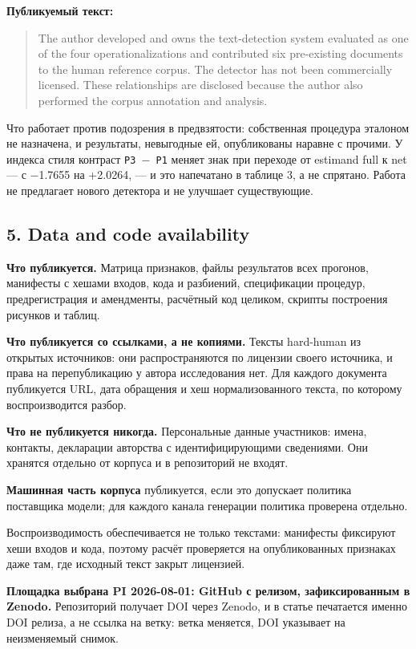 \documentclass[11pt,a4paper]{article}
\renewcommand{\_}{\textunderscore\allowbreak}
\begin{document}
\textbf{Публикуемый текст:}

\begin{quote}
The author developed and owns the text-detection system evaluated as one of the
four operationalizations and contributed six pre-existing documents to the human
reference corpus. The detector has not been commercially licensed. These
relationships are disclosed because the author also performed the corpus
annotation and analysis.
\end{quote}

Что работает против подозрения в предвзятости: собственная процедура эталоном не
назначена, и результаты, невыгодные ей, опубликованы наравне с прочими. У индекса
стиля контраст \texttt{P3 $-$ P1} меняет знак при переходе от estimand full к net — с
$-$1.7655 на +2.0264, — и это напечатано в таблице 3, а не спрятано. Работа не
предлагает нового детектора и не улучшает существующие.

\subsection{5. Data and code availability}

\textbf{Что публикуется.} Матрица признаков, файлы результатов всех прогонов, манифесты
с хешами входов, кода и разбиений, спецификации процедур, предрегистрация и
амендменты, расчётный код целиком, скрипты построения рисунков и таблиц.

\textbf{Что публикуется со ссылками, а не копиями.} Тексты hard-human из открытых
источников: они распространяются по лицензии своего источника, и права на
перепубликацию у автора исследования нет. Для каждого документа публикуется URL,
дата обращения и хеш нормализованного текста, по которому воспроизводится разбор.

\textbf{Что не публикуется никогда.} Персональные данные участников: имена, контакты,
декларации авторства с идентифицирующими сведениями. Они хранятся отдельно от
корпуса и в репозиторий не входят.

\textbf{Машинная часть корпуса} публикуется, если это допускает политика поставщика
модели; для каждого канала генерации политика проверена отдельно.

Воспроизводимость обеспечивается не только текстами: манифесты фиксируют хеши
входов и кода, поэтому расчёт проверяется на опубликованных признаках даже там, где
исходный текст закрыт лицензией.

\textbf{Площадка выбрана PI 2026-08-01: GitHub с релизом, зафиксированным в Zenodo.}
Репозиторий получает DOI через Zenodo, и в статье печатается именно DOI релиза, а не
ссылка на ветку: ветка меняется, DOI указывает на неизменяемый снимок.
\end{document}
